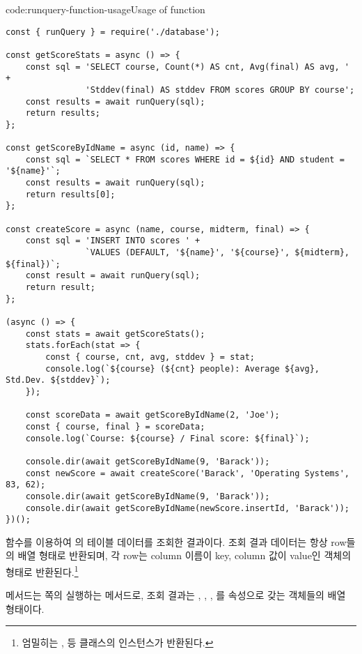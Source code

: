 \begin{code}{code:runquery-function-usage}{Usage of  function}
\begin{verbatim}
const { runQuery } = require('./database');

const getScoreStats = async () => {
    const sql = 'SELECT course, Count(*) AS cnt, Avg(final) AS avg, ' +
                'Stddev(final) AS stddev FROM scores GROUP BY course';
    const results = await runQuery(sql);
    return results;
};

const getScoreByIdName = async (id, name) => {
    const sql = `SELECT * FROM scores WHERE id = ${id} AND student = '${name}'`;
    const results = await runQuery(sql);
    return results[0];
};

const createScore = async (name, course, midterm, final) => {
    const sql = 'INSERT INTO scores ' +
                `VALUES (DEFAULT, '${name}', '${course}', ${midterm}, ${final})`;
    const result = await runQuery(sql);
    return result;
};

(async () => {
    const stats = await getScoreStats();
    stats.forEach(stat => {
        const { course, cnt, avg, stddev } = stat;
        console.log(`${course} (${cnt} people): Average ${avg}, Std.Dev. ${stddev}`);
    });

    const scoreData = await getScoreByIdName(2, 'Joe');
    const { course, final } = scoreData;
    console.log(`Course: ${course} / Final score: ${final}`);

    console.dir(await getScoreByIdName(9, 'Barack'));
    const newScore = await createScore('Barack', 'Operating Systems', 83, 62);
    console.dir(await getScoreByIdName(9, 'Barack'));
    console.dir(await getScoreByIdName(newScore.insertId, 'Barack'));
})();
\end{verbatim}
\end{code}

\는  함수를 이용하여 의  테이블 데이터를 조회한 결과이다. 조회 결과 데이터는 항상 row들의 배열 형태로 반환되며, 각 row는 column 이름이 key, column 값이 value인 객체의 형태로 반환된다.\footnote{엄밀히는 ,  등 클래스의 인스턴스가 반환된다.}

 메서드는 \pageref{code:group-by-example}쪽의 \을 실행하는 메서드로, 조회 결과는 , , , 를 속성으로 갖는 객체들의 배열 형태이다.


